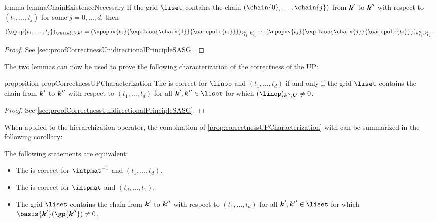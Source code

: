 \begin{restatable}{%
  lemma%
}{%
  lemmaChainExistenceNecessary%
}
  \label{lemma:chainExistenceNecessary}
  If the grid $\liset$ contains the chain $(\chain{0}, \dotsc, \chain{j})$
  from ${\boldsymbol{k}}'$ to ${\boldsymbol{k}}''$ with respect to $(t_1, \dotsc, t_j)$
  for some $j = 0, \dotsc, d$, then
  \begin{equation}
    \label{eq:lemmaChainExistenceNecessary}
    (\upop{t_1,\dotsc,t_j})_{\chain{j},\*k'}
    = (\upopuv{t_1}{\eqclass{\chain{1}}{\samepole{t_1}}})_{k''_{t_1},k'_{t_1}}
    \dotsm
    (\upopuv{t_j}{\eqclass{\chain{j}}{\samepole{t_j}}})_{k''_{t_j},k'_{t_j}}.
  \end{equation}
\end{restatable}

\begin{proof}
  See \cref{sec:proofCorrectnessUnidirectionalPrincipleSASG}.
\end{proof}

The two lemmas can now be used to prove the following characterization
of the correctness of the UP:

\begin{restatable}{%
  proposition%
}{%
  propCorrectnessUPCharacterization%
}
  \label{prop:correctnessUPCharacterization}
  The \up is correct for $\linop$ and $(t_1, \dotsc, t_d)$
  if and only if the grid $\liset$ contains the chain from ${\boldsymbol{k}}'$ to ${\boldsymbol{k}}''$
  with respect to $(t_1, \dotsc, t_d)$ for all $\*k', \*k'' \in \liset$
  for which $(\linop)_{\*k'',\*k'} \not= 0$.
\end{restatable}

\begin{proof}
  See \cref{sec:proofCorrectnessUnidirectionalPrincipleSASG}.
\end{proof}

When applied to the hierarchization operator,
the combination of \cref{prop:correctnessUPCharacterization} with
 can be summarized in
the following corollary:

\begin{corollary}
  \label{cor:equivalentCorrectnessUPHierarchization}
  The following statements are equivalent:
  \begin{itemize}
    \item
    The \up is correct for $\intpmatinv$ and $(t_1, \dotsc, t_d)$.
    
    \item
    The \up is correct for $\intpmat$ and $(t_d, \dotsc, t_1)$.
    
    \item
    The grid $\liset$ contains the chain from ${\boldsymbol{k}}'$ to ${\boldsymbol{k}}''$
    with respect to $(t_1, \dotsc, t_d)$ for all $\*k', \*k'' \in \liset$
    for which $\basis{\*k'}(\gp{\*k''}) \not= 0$.
  \end{itemize}
\end{corollary}

